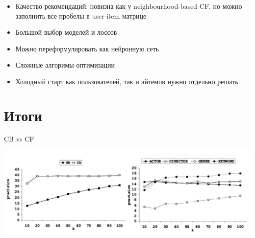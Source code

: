 \documentclass[11pt,aspectratio=169,handout]{beamer}
\begin{document}
\begin{frame}{}

\begin{tcolorbox}[colback=info!5,colframe=info!80,title=Плюсы]
  \begin{itemize}
    \item Качество рекомендаций: новизна как у neighbourhood-based CF, но можно заполнить все пробелы в user-item матрице
    \item Большой выбор моделей и лоссов
    \item Можно переформулировать как нейронную сеть
  \end{itemize}
\end{tcolorbox}

\begin{tcolorbox}[colback=warn!5,colframe=warn!80,title=Минусы]
  \begin{itemize}
    \item Сложные алгоримы оптимизации
    \item Холодный старт как пользователей, так и айтемов нужно отдельно решать
  \end{itemize}
\end{tcolorbox}

\end{frame}

\section{Итоги}

\begin{frame}{CB vs CF}

\begin{center}
\includegraphics[scale=0.5]{images/comparison2.png}
\end{center}

\end{frame}
\end{document}
